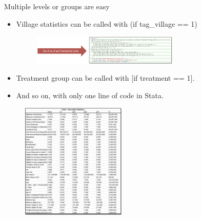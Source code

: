 \documentclass[aspectratio=169]{beamer}
\begin{document}
\begin{frame}{Multiple levels or groups are easy}
	\begin{multicols}{2}	
		
		\begin{itemize}[<default overlay specification>]
			\item<1> Village statistics can be called with (if tag\_village == 1)
			
			\begin{figure}
				\centering
				\includegraphics[width=70mm]{img/Table6}
			\end{figure}
			
			\item<1> Treatment group can be called with [if treatment == 1].
			\item<1> And so on, with only one line of code in Stata.
		\end{itemize}
		
		\begin{figure}
			\centering
			\includegraphics[width=50mm]{img/Table7}
		\end{figure}
		
	\end{multicols}
\end{frame}
\end{document}
